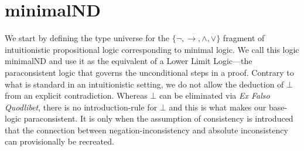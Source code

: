 \documentclass[]{article}
\begin{document}






\section{{\sf minimalND}}\label{sec:lower}

We start by defining the type universe for the $\{\neg, \rightarrow, \wedge, \vee\}$ fragment of intuitionistic propositional logic corresponding to minimal logic. We call this logic {\sf minimalND} and use it as the equivalent of a Lower Limit Logic---the paraconsistent logic that governs the unconditional steps in a proof. Contrary to what is standard in an intuitionistic setting, we do not allow the deduction of $\bot$ from an explicit contradiction. Whereas $\bot$ can be eliminated via \emph{Ex Falso Quodlibet}, there is no introduction-rule for $\bot$ and this is what makes our base-logic paraconsistent. It is only when the assumption of consistency is introduced that the connection between negation-inconsistency and absolute inconsistency can provisionally be recreated.
\end{document}
